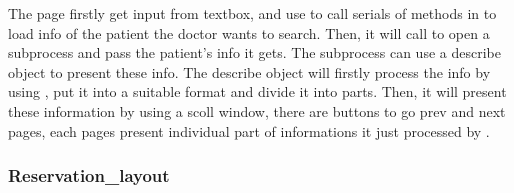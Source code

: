 \documentclass{article}
\begin{document}
The page firstly get input from textbox, and use 
 to call serials of methods in 
 to load info of the patient the 
doctor wants to search. Then, it will call  
to open a subprocess and pass the patient's info it gets. The 
subprocess can use a describe object to present these info.
The describe object will firstly process the info by using 
, put it into a suitable format 
and divide it into parts. Then, it will present these information 
by using a scoll window, there are buttons to go prev and next 
pages, each pages present individual part of informations it 
just processed by .

\subsubsection*{Reservation\_layout}
\end{document}
